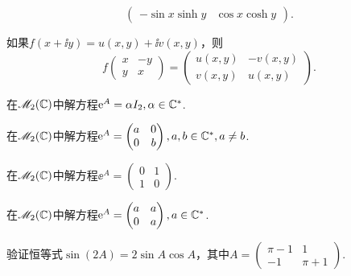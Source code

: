 \begin{mybox}
\begin{problem}
\begin{enum}
\[\begin{pmatrix}
            -\sin x\sinh y & \cos x \cosh y
          \end{pmatrix}.
        \]
    \item 如果$f(x+\ii y)=u(x,y)+\ii v(x,y)$，则
        \[
          f\begin{pmatrix}
            x & -y \\
            y & x
          \end{pmatrix} = \begin{pmatrix}
            u(x,y) & -v(x,y) \\
            v(x,y) & u(x,y)
          \end{pmatrix}.
        \]
  \end{enum}
  \end{problem}
\end{mybox}

\begin{problem}
  在$\mathscr M_2(\mathbb C)$中解方程$\operatorname{\!\!\;\mathrm e}^A=\alpha I_2,\alpha\in\mathbb C^\ast$.
\end{problem}

\begin{problem}
  在$\mathscr M_2(\mathbb C)$中解方程$\operatorname{\!\!\;\mathrm e}^A=\begin{pmatrix}
    a & 0 \\
    0 & b
  \end{pmatrix},a,b\in\mathbb C^\ast,a\ne b$.
\end{problem}

\begin{mybox}
  \begin{problem}[一个循环指数方程.]

    在$\mathscr M_2(\mathbb C)$中解方程$\ee^A=\begin{pmatrix}
      0 & 1 \\
      1 & 0
    \end{pmatrix}$.
  \end{problem}
\end{mybox}

\begin{mybox}
  \begin{problem}[一个三角形指数方程.]

    在$\mathscr M_2(\mathbb C)$中解方程$\operatorname{\!\!\;\mathrm e}^A=\begin{pmatrix}
      a & a \\
      0 & a
    \end{pmatrix},a\in\mathbb C^\ast$.
  \end{problem}
\end{mybox}

\begin{problem}
  验证恒等式$\sin(2A)=2\sin A\cos A$，其中$A=\begin{pmatrix}
    \pi-1 & 1 \\
    -1 & \pi+1
  \end{pmatrix}$.
\end{problem}

